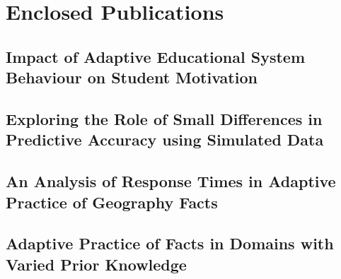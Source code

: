 \documentclass[table,color,cover,twoside,nolot,nolof]{fithesis3/fithesis3}
\begin{document}



\appendix
\chapter{Enclosed Publications}
\section{Impact of Adaptive Educational System Behaviour on Student Motivation}

\section{Exploring the Role of Small Differences in Predictive Accuracy using  Simulated Data}

\section{An Analysis of Response Times in Adaptive Practice of Geography Facts}

\section{Adaptive Practice of Facts in Domains with Varied Prior Knowledge}

\end{document}
